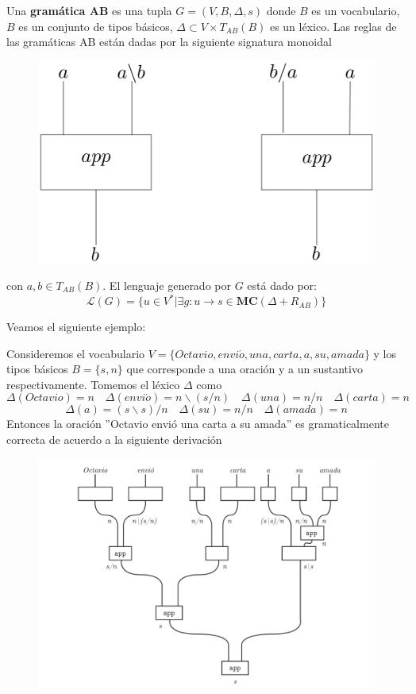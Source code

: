 \documentclass[../main.tex]{subfiles}
\begin{document}
	\begin{dfn}
		Una \textbf{gramática AB} es una tupla $G=(V,B,\Delta,s)$ donde $B$ es un vocabulario, $B$ es un conjunto de tipos básicos, $\Delta \subset V \times T_{AB}(B)$ es un léxico. Las reglas de las gramáticas AB están dadas por la siguiente signatura monoidal 
		\begin{figure}[H]
			\includegraphics[scale=18]{diagrama/AB.png}
			\centering
		\end{figure}
		con $a,b \in T_{AB}(B)$. El lenguaje generado por $G$ está dado por:
		$$\mathcal{L}(G)= \{ u \in V^*|\exists g:u \to s \in \textbf{MC}(\Delta + R_{AB}) \}$$
	\end{dfn}
	
	Veamos el siguiente ejemplo:
	
	\begin{ej}
        \label{gramAB}
		Consideremos el vocabulario $V= \{ Octavio, envi\acute{o} , una, carta, a, su, amada \}$ y los tipos básicos $B= \{s,n\}$ que corresponde a una oración y a un sustantivo respectivamente. Tomemos el léxico $\Delta$ como
		$$\Delta(Octavio)=n \quad \Delta(envi\acute{o})=n \backslash (s/n) \quad \Delta(una)=n/n \quad \Delta(carta)=n$$
        $$\Delta(a)=(s\backslash s)/n \quad \Delta(su)=n/n \quad \Delta(amada)=n$$
		Entonces la oración ''Octavio envió una carta a su amada'' es gramaticalmente correcta de acuerdo a la siguiente derivación
		\begin{figure}[H]		\includegraphics[scale=.45]{TeX/diagrama/4-2.pdf}
			\centering
		\end{figure}
	\end{ej}
	 
\end{document}
